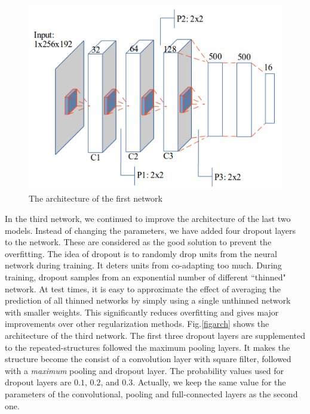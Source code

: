 \documentclass[conference]{IEEEtran}
\begin{document}
\begin{figure}[htbp]
	\centerline{\includegraphics[scale=0.45]{images/architecture1}}
	\caption{The architecture of the first network}
	\label{figarch0}
\end{figure}

In the third network, we continued to improve the architecture of the last two models. Instead of changing the parameters, we have added four dropout layers to the network. These are considered as the good solution to prevent the overfitting. The idea of dropout is to randomly drop units from the neural network during training. It deters units from co-adapting too much. During training, dropout samples from an exponential number of different ``thinned" network. At test times, it is easy to approximate the effect of averaging the prediction of all thinned networks by simply using a single unthinned network with smaller weights. This significantly reduces overfitting and gives major improvements over other regularization methods\cite{srivastava2014dropout}. Fig.\ref{figarch} shows the architecture of the third network. The first three dropout layers are supplemented to the repeated-structures followed the maximum pooling layers. It makes the structure become the consist of a convolution layer with square filter, followed with a \textit{maximum} pooling and dropout layer. The probability values used for dropout layers are $0.1$, $0.2$, and $0.3$. Actually, we keep the same value for the parameters of the convolutional, pooling and full-connected layers as the second one.
\end{document}
